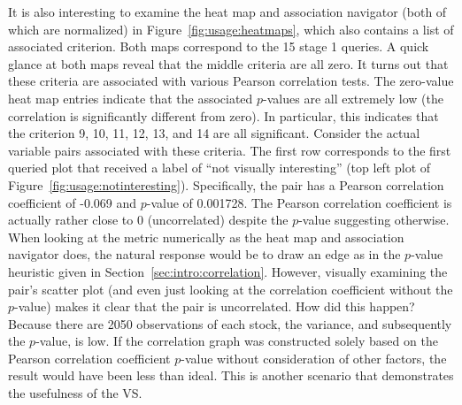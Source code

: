 It is also interesting to examine the heat map and association navigator (both 
of which are normalized) in Figure~\ref{fig:usage:heatmaps}, which also 
contains a list of associated criterion. Both maps correspond to the 15 stage 1 
queries. A quick glance at both maps reveal that 
the middle criteria are all zero. It turns out that these criteria 
are associated with various Pearson correlation tests. 
The zero-value heat map entries indicate that the associated $p$-values are all 
extremely low (the correlation is significantly different from zero). In 
particular, this indicates that the criterion 9, 10, 11, 12, 13, and 14 are 
all significant. Consider the actual variable pairs associated with these 
criteria. The first row corresponds to the first queried plot that received a 
label of ``not visually interesting'' (top left plot of 
Figure~\ref{fig:usage:notinteresting}). Specifically, the pair has a Pearson 
correlation coefficient of -0.069 and $p$-value of 0.001728. The Pearson 
correlation coefficient is actually rather close to 0 
(uncorrelated) despite the $p$-value suggesting otherwise. When looking at the 
metric numerically as the heat map and association navigator does, the natural 
response would be to draw an edge as in the $p$-value heuristic given in 
Section~\ref{sec:intro:correlation}. 
However, visually examining the pair's scatter plot (and even just looking at 
the correlation coefficient without the $p$-value) makes it clear that the pair 
is uncorrelated. How did this happen? Because there are 2050 observations of 
each stock, the variance, and subsequently the $p$-value, is low. 
If the correlation graph was constructed solely based on 
the Pearson correlation coefficient $p$-value without consideration of other 
factors, the result would have been less than ideal. This is another scenario 
that demonstrates the usefulness of the VS.

